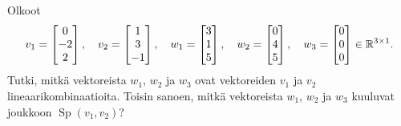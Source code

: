 \documentclass[11pt,a4paper]{amsart}
\begin{document}
\begin{exercise}
  Olkoot
  \[
    v_1 =
    \begin{bmatrix} 0 \\ -2 \\ 2
    \end{bmatrix},
    \quad
    v_2 =
    \begin{bmatrix} 1 \\ 3 \\ -1
    \end{bmatrix},
    \quad
    w_1 =
    \begin{bmatrix} 3 \\ 1 \\ 5
    \end{bmatrix},
    \quad
    w_2 =
    \begin{bmatrix} 0 \\ 4 \\ 5
    \end{bmatrix},
    \quad
    w_3 =
    \begin{bmatrix} 0 \\ 0 \\ 0
    \end{bmatrix}
    \in \mathbb{R}^{3\times 1}.
  \]
  Tutki, mitkä vektoreista \(w_1\), \(w_2\) ja \(w_3\) ovat vektoreiden
  \(v_1\) ja \(v_2\) lineaarikombinaatioita. Toisin sanoen, mitkä
  vektoreista \(w_1\), \(w_2\) ja \(w_3\) kuuluvat joukkoon
  \(\operatorname{Sp}(v_1,v_2)\)?
\end{exercise}
\end{document}
